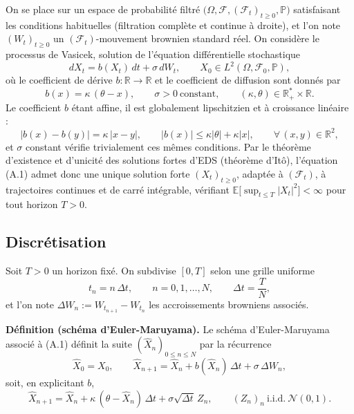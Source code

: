 On se place sur un espace de probabilité filtré $\bigl(\Omega,\mathcal{F},(\mathcal{F}_t)_{t\ge 0},\mathbb{P}\bigr)$ satisfaisant les conditions habituelles (filtration complète et continue à droite), et l'on note $(W_t)_{t\ge 0}$ un $(\mathcal{F}_t)$-mouvement brownien standard réel. On considère le processus de Vasicek, solution de l'équation différentielle stochastique
\begin{equation}
    dX_t = b(X_t)\,dt + \sigma\,dW_t, \qquad X_0 \in L^2(\Omega,\mathcal{F}_0,\mathbb{P}),
    \tag{A.1}
\end{equation}
où le coefficient de dérive $b:\mathbb{R}\to\mathbb{R}$ et le coefficient de diffusion sont donnés par
\[
    b(x) = \kappa\,(\theta - x), \qquad \sigma > 0\ \text{constant}, \qquad (\kappa,\theta) \in \mathbb{R}_+^* \times \mathbb{R}.
\]
Le coefficient $b$ étant affine, il est globalement lipschitzien et à croissance linéaire :
\[
    |b(x) - b(y)| = \kappa\,|x - y|, \qquad |b(x)| \le \kappa|\theta| + \kappa|x|, \qquad \forall\,(x,y) \in \mathbb{R}^2,
\]
et $\sigma$ constant vérifie trivialement ces mêmes conditions. Par le théorème d'existence et d'unicité des solutions fortes d'EDS (théorème d'Itô), l'équation (A.1) admet donc une unique solution forte $(X_t)_{t\ge 0}$, adaptée à $(\mathcal{F}_t)$, à trajectoires continues et de carré intégrable, vérifiant $\mathbb{E}\bigl[\sup_{t\le T}|X_t|^2\bigr] < \infty$ pour tout horizon $T > 0$.

\subsection*{Discrétisation}

Soit $T > 0$ un horizon fixé. On subdivise $[0,T]$ selon une grille uniforme
\[
    t_n = n\,\Delta t, \qquad n = 0, 1, \dots, N, \qquad \Delta t = \frac{T}{N},
\]
et l'on note $\Delta W_n := W_{t_{n+1}} - W_{t_n}$ les accroissements browniens associés.

\medskip
\noindent\textbf{Définition (schéma d'Euler-Maruyama).}
Le schéma d'Euler-Maruyama associé à (A.1) définit la suite $(\widehat{X}_n)_{0\le n\le N}$ par la récurrence
\begin{equation}
    \widehat{X}_0 = X_0, \qquad
    \widehat{X}_{n+1} = \widehat{X}_n + b(\widehat{X}_n)\,\Delta t + \sigma\,\Delta W_n,
    \tag{A.2}
\end{equation}
soit, en explicitant $b$,
\begin{equation}
    \widehat{X}_{n+1} = \widehat{X}_n + \kappa\,(\theta - \widehat{X}_n)\,\Delta t + \sigma\sqrt{\Delta t}\,Z_n,
    \qquad (Z_n)_n\ \text{i.i.d.}\ \mathcal{N}(0,1).
    \tag{A.3}
\end{equation}

